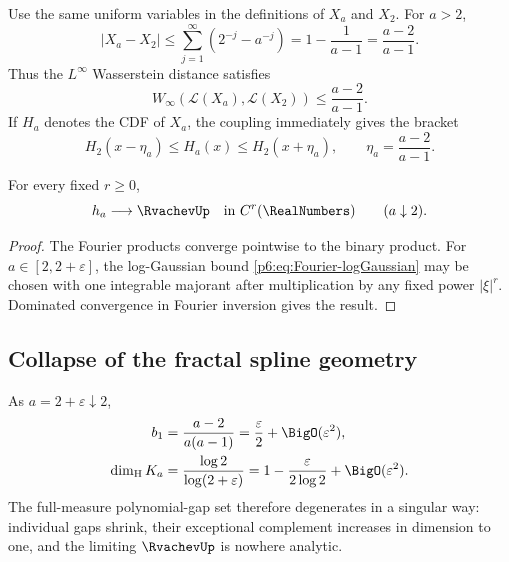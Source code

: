 \documentclass[11pt,oneside]{article}
\numberwithin{equation}{section}
\theoremstyle{definition}
\theoremstyle{remark}
\begin{document}
Use the same uniform variables in the definitions of $X_a$ and $X_2$.  For
$a>2$,
\begin{equation}\label{p6:eq:coupling-bound}
 |X_a-X_2|
 \le\sum_{j=1}^{\infty}(2^{-j}-a^{-j})
 =1-\frac1{a-1}
 =\frac{a-2}{a-1}.
\end{equation}
Thus the $L^\infty$ Wasserstein distance satisfies
\begin{equation}\label{p6:eq:Winfty}
 W_\infty(\mathcal L(X_a),\mathcal L(X_2))
 \le\frac{a-2}{a-1}.
\end{equation}
If $H_a$ denotes the CDF of $X_a$, the coupling immediately gives the bracket
\begin{equation}\label{p6:eq:CDF-bracket}
 H_2(x-\eta_a)\le H_a(x)\le H_2(x+\eta_a),
 \qquad \eta_a=\frac{a-2}{a-1}.
\end{equation}

\begin{proposition}\label{p6:prop:C-r-to-up}
For every fixed $r\ge0$,
\begin{equation}\label{p6:eq:C-r-convergence}
 h_a\longrightarrow\RvachevUp
 \quad\text{in }C^r(\RealNumbers)
 \qquad(a\downarrow2).
\end{equation}
\end{proposition}

\begin{proof}
The Fourier products converge pointwise to the binary product.  For
$a\in[2,2+\varepsilon]$, the log-Gaussian bound
\eqref{p6:eq:Fourier-logGaussian} may be chosen with one integrable majorant after
multiplication by any fixed power $|\xi|^r$.  Dominated convergence in Fourier
inversion gives the result.
\end{proof}

\subsection{Collapse of the fractal spline geometry}

As $a=2+\varepsilon\downarrow2$,
\begin{align}
 b_1&=\frac{a-2}{a(a-1)}
 =\frac\varepsilon2+\BigO(\varepsilon^2),\label{p6:eq:gap-collapse}\\
 \dim_{\mathrm H}K_a&=\frac{\log2}{\log(2+\varepsilon)}
 =1-\frac{\varepsilon}{2\log2}+\BigO(\varepsilon^2).
 \label{p6:eq:dimension-collapse}
\end{align}
The full-measure polynomial-gap set therefore degenerates in a singular way:
individual gaps shrink, their exceptional complement increases in dimension to
one, and the limiting $\RvachevUp$ is nowhere analytic.
\end{document}
